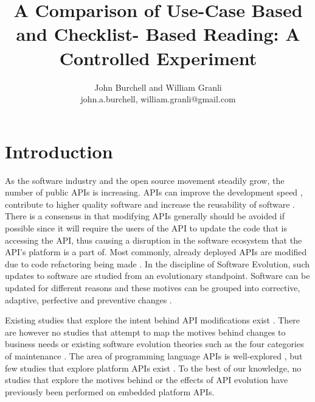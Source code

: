 \documentclass[10pt,twocolumn]{article}
\begin{document}
\title{A Comparison of Use-Case Based and Checklist-
Based Reading: A Controlled Experiment}

\author{John Burchell and William Granli \\
john.a.burchell, william.granli@gmail.com}


\maketitle
\thispagestyle{empty}


\section{Introduction}
As the software industry and the open source movement steadily grow, the number of public APIs is increasing. APIs can improve the development speed \cite{stylos2006comparing}, contribute to higher quality software \cite{stylos2006comparing} and increase the reusability of software \cite{afonso2012evaluating}.  There is a consensus in that modifying APIs generally should be avoided if possible \cite{google_talk} \cite{mcdonnell2013empirical} \cite{robbes2012developers} \cite{henning2007api} \cite{robbes2012developers} since it will require the users of the API to update the code that is accessing the API, thus causing a disruption in the software ecosystem \cite{messerschmitt2005software} that the API's platform is a part of. Most commonly, already deployed APIs are modified due to code refactoring being made \cite{dig2005role} \cite{xing2006refactoring}. 
In the discipline of Software Evolution, such updates to software are studied from an evolutionary standpoint. Software can be updated for different reasons and these motives can be grouped into corrective, adaptive, perfective and preventive changes \cite{lientz1980software} \cite{iso}. 

Existing studies that explore the intent behind API modifications exist \cite{hou2011exploring}. There are however no studies that attempt to map the motives behind changes to business needs or existing software evolution theories such as the four categories of maintenance \cite{lientz1980software}. The area of programming language APIs is well-explored \cite{hou2011exploring} \cite{shi2011empirical}, but few studies that explore platform APIs exist \cite{robbes2012developers}. To the best of our knowledge, no studies that explore the motives behind or the effects of API evolution have previously been performed on embedded platform APIs. 
\end{document}
